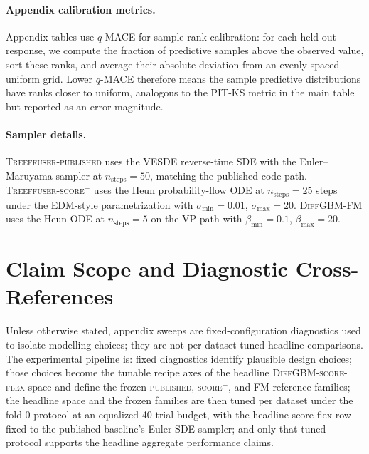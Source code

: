 \documentclass{article}
\begin{document}
\paragraph{Appendix calibration metrics.} Appendix tables use $q$-MACE for sample-rank calibration: for each held-out response, we compute the fraction of predictive samples above the observed value, sort these ranks, and average their absolute deviation from an evenly spaced uniform grid. Lower $q$-MACE therefore means the sample predictive distributions have ranks closer to uniform, analogous to the PIT-KS metric in the main table but reported as an error magnitude.

\paragraph{Sampler details.}
\textsc{Treeffuser-published} uses the VESDE reverse-time SDE with the Euler--Maruyama sampler at $n_{\text{steps}}=50$, matching the published code path. \textsc{Treeffuser-score$^+$} uses the Heun probability-flow ODE at $n_{\text{steps}}=25$ steps under the EDM-style parametrization with $\sigma_{\min}=0.01$, $\sigma_{\max}=20$. \textsc{DiffGBM-FM} uses the Heun ODE at $n_{\text{steps}}=5$ on the VP path with $\beta_{\min}=0.1$, $\beta_{\max}=20$.

\section{Claim Scope and Diagnostic Cross-References}\label{app:score-side}

Unless otherwise stated, appendix sweeps are fixed-configuration diagnostics used to isolate modelling choices; they are not per-dataset tuned headline comparisons. The experimental pipeline is: fixed diagnostics identify plausible design choices; those choices become the tunable recipe axes of the headline \textsc{DiffGBM-score-flex} space and define the frozen \textsc{published}, \textsc{score$^+$}, and \textsc{FM} reference families; the headline space and the frozen families are then tuned per dataset under the fold-0 protocol at an equalized 40-trial budget, with the headline score-flex row fixed to the published baseline's Euler-SDE sampler; and only that tuned protocol supports the headline aggregate performance claims.
\end{document}
